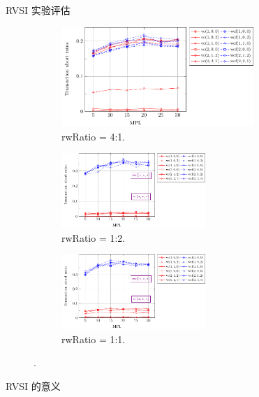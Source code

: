 \begin{frame}{RVSI 实验评估}
  \begin{figure}
	\begin{subfigure}{0.60\textwidth}
	  \centering
	  \includegraphics[width = 0.80\textwidth]{figures/rvsi-rw4-abort-rates.pdf}
	  \caption{rwRatio = 4:1.}
	\end{subfigure}%

	\begin{subfigure}{0.50\textwidth}
	  \centering
	  \includegraphics[width = 0.60\textwidth]{figures/rvsi-rw05-abort-rates.pdf}
	  \caption{rwRatio = 1:2.}
	\end{subfigure}%
	\begin{subfigure}{0.50\textwidth}
	  \centering
	  \includegraphics[width = 0.60\textwidth]{figures/rvsi-rw1-abort-rates.pdf}
	  \caption{rwRatio = 1:1.}
	\end{subfigure}%
	\caption{.}
  \end{figure}
\end{frame}
\begin{frame}{RVSI 的意义}
\end{frame}
